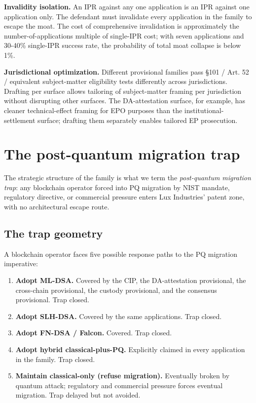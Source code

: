 \documentclass[11pt,letterpaper]{article}
\begin{document}
\textbf{Invalidity isolation.} An IPR against any one application is an IPR against one application only. The defendant must invalidate every application in the family to escape the moat. The cost of comprehensive invalidation is approximately the number-of-applications multiple of single-IPR cost; with seven applications and 30-40\% single-IPR success rate, the probability of total moat collapse is below 1\%.

\textbf{Jurisdictional optimization.} Different provisional families pass §101 / Art. 52 / equivalent subject-matter eligibility tests differently across jurisdictions. Drafting per surface allows tailoring of subject-matter framing per jurisdiction without disrupting other surfaces. The DA-attestation surface, for example, has cleaner technical-effect framing for EPO purposes than the institutional-settlement surface; drafting them separately enables tailored EP prosecution.

\section{The post-quantum migration trap}

The strategic structure of the family is what we term the \emph{post-quantum migration trap}: any blockchain operator forced into PQ migration by NIST mandate, regulatory directive, or commercial pressure enters Lux Industries' patent zone, with no architectural escape route.

\subsection{The trap geometry}

A blockchain operator faces five possible response paths to the PQ migration imperative:

\begin{enumerate}
\item \textbf{Adopt ML-DSA.} Covered by the CIP, the DA-attestation provisional, the cross-chain provisional, the custody provisional, and the consensus provisional. Trap closed.
\item \textbf{Adopt SLH-DSA.} Covered by the same applications. Trap closed.
\item \textbf{Adopt FN-DSA / Falcon.} Covered. Trap closed.
\item \textbf{Adopt hybrid classical-plus-PQ.} Explicitly claimed in every application in the family. Trap closed.
\item \textbf{Maintain classical-only (refuse migration).} Eventually broken by quantum attack; regulatory and commercial pressure forces eventual migration. Trap delayed but not avoided.
\end{enumerate}
\end{document}
